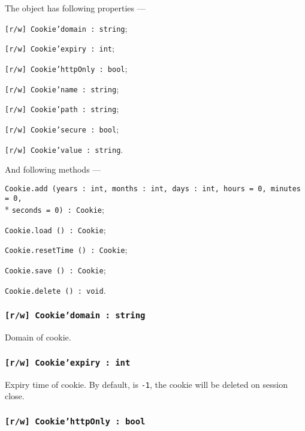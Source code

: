 The object \cookie{} has following properties —
\begin{icItems}
	\item \texttt{[r/w] Cookie'domain : string};
	\item \texttt{[r/w] Cookie'expiry : int};
	\item \texttt{[r/w] Cookie'httpOnly : bool};
	\item \texttt{[r/w] Cookie'name : string};
	\item \texttt{[r/w] Cookie'path : string};
	\item \texttt{[r/w] Cookie'secure : bool};
	\item \texttt{[r/w] Cookie'value : string}.
\end{icItems}

And following methods —
\begin{icItems}
	\item \texttt{Cookie.add (years : int, months : int, days : int, hours = 0, minutes = 0,}\\* \texttt{seconds = 0) : Cookie};
	\item \texttt{Cookie.load () : Cookie};
	\item \texttt{Cookie.resetTime () : Cookie};
	\item \texttt{Cookie.save () : Cookie};
	\item \texttt{Cookie.delete () : void}.
\end{icItems}

\subsubsection{\texttt{[r/w] Cookie'domain : string}}

Domain of cookie.

\subsubsection{\texttt{[r/w] Cookie'expiry : int}}

Expiry time of cookie. By default, is \texttt{-1}, the cookie will be deleted on session close.

\subsubsection{\texttt{[r/w] Cookie'httpOnly : bool}}

